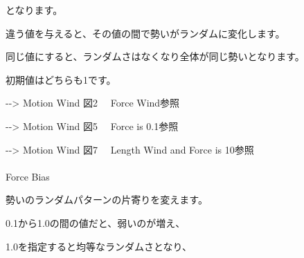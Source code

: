 \documentclass[a4paper,12pt]{article}
\begin{document}
となります。\par
違う値を与えると、その値の間で勢いがランダムに変化します。\par
同じ値にすると、ランダムさはなくなり全体が同じ勢いとなります。\par
初期値はどちらも1です。\par
-{-}> \textquotedbl Motion Wind 図2 \ \ Force Wind\textquotedbl 参照\par
-{-}> \textquotedbl Motion Wind 図5 \ \ Force is 0.1\textquotedbl 参照\par
-{-}> \textquotedbl Motion Wind 図7 \ \ Length Wind and Force is 10\textquotedbl 参照\\
\\
Force Bias\par
勢いのランダムパターンの片寄りを変えます。\par
0.1から1.0の間の値だと、弱いのが増え、\par
1.0を指定すると均等なランダムさとなり、

\newpage

\thispagestyle{empty}
\end{document}
